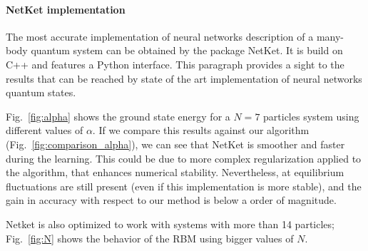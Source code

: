 \documentclass[a4paper,11pt]{article}
\begin{document}
\paragraph{NetKet implementation}

The most accurate implementation of neural networks description of a many-body quantum system can be obtained by the package NetKet\cite{netket}. It is build on C++ and features a Python interface. This paragraph provides a sight to the results that can be reached by state of the art implementation of neural networks quantum states.

Fig.~\ref{fig:alpha} shows the ground state energy for a $N=7$ particles system using different values of $\alpha$. If we compare this results against our algorithm (Fig.~\ref{fig:comparison_alpha}), we can see that NetKet is smoother and faster during the learning. This could be due to more complex regularization applied to the algorithm, that enhances numerical stability. Nevertheless, at equilibrium fluctuations are still present (even if this implementation is more stable), and the gain in accuracy with respect to our method is below a order of magnitude.

Netket is also optimized to work with systems with more than 14 particles; Fig.~\ref{fig:N} shows the behavior of the RBM using bigger values of $N$.
\end{document}
